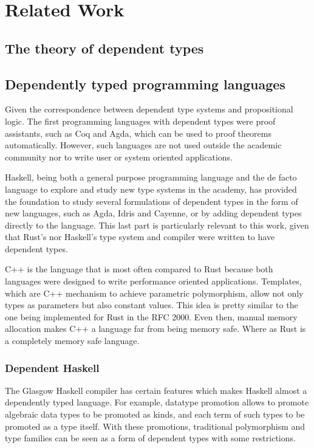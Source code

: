 \chapter{Related Work} \label{chapter:related_work}

\section{The theory of dependent types}

\section{Dependently typed programming languages}

Given the correspondence between dependent type systems and propositional logic.
The first programming languages with dependent types were proof assistants, such
as Coq and Agda, \cite{agda} which can be used to proof theorems automatically.
However, such languages are not used outside the academic community nor to write
user or system oriented applications.

Haskell, being both a general purpose programming language and the de facto
language to explore and study new type systems in the academy, has provided the
foundation to study several formulations of dependent types in the form of new
languages, such as Agda, Idris \cite{idris} and Cayenne, \cite{cayenne} or by
adding dependent types directly to the language. This last part is particularly
relevant to this work, given that Rust's nor Haskell's type system and compiler
were written to have dependent types.

C++ is the language that is most often compared to Rust because both languages
were designed to write performance oriented applications. Templates, which are
C++ mechanism to achieve parametric polymorphism, allow not only types as
parameters but also constant values. \cite{templates} This idea is pretty
similar to the one being implemented for Rust in the RFC 2000. Even then, manual
memory allocation makes C++ a language far from being memory safe.  Where as
Rust is a completely memory safe language.    

\subsection{Dependent Haskell} 

The Glasgow Haskell compiler has certain features which makes Haskell almost a
dependently typed language. For example, datatype promotion allows to promote
algebraic data types to be promoted as kinds, and each term of such types to be 
promoted as a type itself. With these promotions, traditional polymorphism and
type families can be seen as a form of dependent types with some restrictions.

